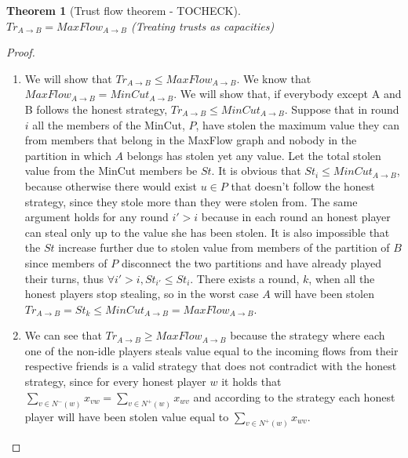 \documentclass[11pt]{article}
\newtheorem{theorem}{Theorem}[section]
\theoremstyle{definition}
\theoremstyle{corollary}
\begin{document}
    \begin{theorem}[Trust flow theorem - TOCHECK] \ \\
    \label{trustflow}
       $Tr_{A \rightarrow B} = MaxFlow_{A \rightarrow B}$ (Treating trusts as capacities)
    \end{theorem}
    \begin{proof} \
        \begin{enumerate}
	   \item We will show that $Tr_{A \rightarrow B} \leq MaxFlow_{A \rightarrow B}$.
           We know that $MaxFlow_{A \rightarrow B} = MinCut_{A \rightarrow B}$. We will show that, if everybody except
           A and B follows the honest strategy,  $Tr_{A \rightarrow B} \leq MinCut_{A \rightarrow B}$. Suppose that in
           round $i$ all the members of the MinCut, $P$, have stolen the maximum value they can from members that belong
           in the MaxFlow graph and nobody in the partition in which $A$ belongs has stolen yet any value. Let the total
           stolen value from the MinCut members be $St$. It is obvious that $St_i \leq MinCut_{A \rightarrow B}$, because
           otherwise there would exist $u \in P$ that doesn't follow the honest strategy, since they stole more than they
           were stolen from. The same argument holds for any round $i' > i$ because in each round an honest player can
           steal only up to the value she has been stolen. It is also impossible that the $St$ increase further due to
           stolen value from members of the partition of $B$ since members of $P$ disconnect the two partitions and have
           already played their turns, thus $\forall i' > i, St_{i'} \leq St_i$. There exists a round, $k$, when all the
           honest players stop stealing, so in the worst case $A$ will have been stolen
           $Tr_{A \rightarrow B} = St_k \leq MinCut_{A \rightarrow B} = MaxFlow_{A \rightarrow B}$.
           \item We can see that $Tr_{A \rightarrow B} \geq MaxFlow_{A \rightarrow B}$ because the strategy where each
           one of the non-idle players steals value equal to the incoming flows from their respective friends is a valid
           strategy that does not contradict with the honest strategy, since for every honest player $w$ it holds that
           $\sum\limits_{v \in N^{-}(w)}x_{vw} = \sum\limits_{v \in N^{+}(w)}x_{wv}$ and according to the strategy each
           honest player will have been stolen value equal to $\sum\limits_{v \in N^{+}(w)}x_{wv}$.
        \end{enumerate}

\end{proof}
\end{document}
